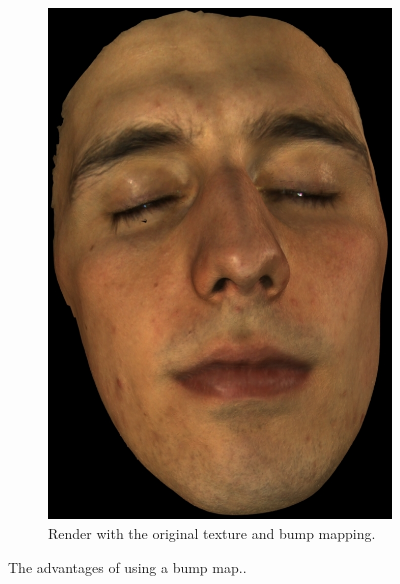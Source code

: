 \begin{figure}
\begin{subfigure}[t]{0.48\textwidth}
                \includegraphics[width=\textwidth]{img/richard_disp_impr}
                \caption{Render with the original texture and bump mapping.}
                \label{fig:richard_disp_impr}
        \end{subfigure}
        \caption{The advantages of using a bump map..}
        \label{fig:bump_mapping_richard}
\end{figure}
